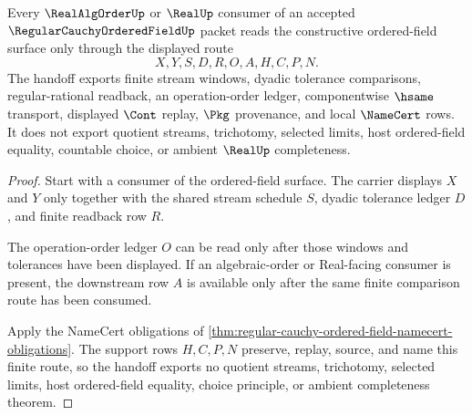 \begin{theorem}
\label{thm:regular-cauchy-ordered-field-operation-order-handoff}
Every $\RealAlgOrderUp$ or $\RealUp$ consumer of an accepted $\RegularCauchyOrderedFieldUp$ packet reads the constructive ordered-field surface only through the displayed route
$$
X,Y,S,D,R,O,A,H,C,P,N .
$$
The handoff exports finite stream windows, dyadic tolerance comparisons, regular-rational readback, an operation-order ledger, componentwise $\hsame$ transport, displayed $\Cont$ replay, $\Pkg$ provenance, and local $\NameCert$ rows. It does not export quotient streams, trichotomy, selected limits, host ordered-field equality, countable choice, or ambient $\RealUp$ completeness.
\end{theorem}
\begin{proof}
Start with a consumer of the ordered-field surface. The carrier displays $X$ and $Y$ only together with the shared stream schedule $S$, dyadic tolerance ledger $D$, and finite readback row $R$.

The operation-order ledger $O$ can be read only after those windows and tolerances have been displayed. If an algebraic-order or Real-facing consumer is present, the downstream row $A$ is available only after the same finite comparison route has been consumed.

Apply the NameCert obligations of \autoref{thm:regular-cauchy-ordered-field-namecert-obligations}. The support rows $H,C,P,N$ preserve, replay, source, and name this finite route, so the handoff exports no quotient streams, trichotomy, selected limits, host ordered-field equality, choice principle, or ambient completeness theorem.
\end{proof}




